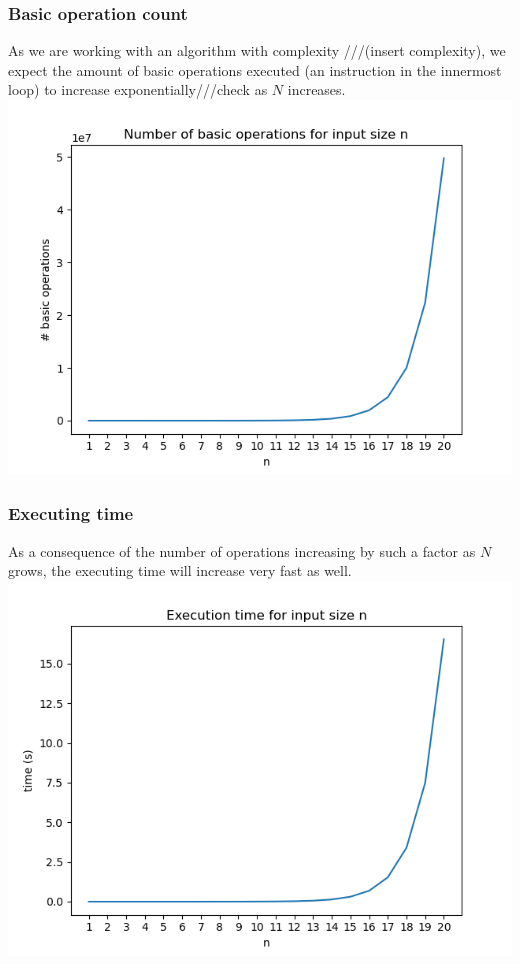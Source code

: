 \documentclass[...]{revdetua}
\begin{document}
\subsubsection{Basic operation count}
As we are working with an algorithm with complexity ///(insert complexity), we expect the amount of basic operations executed (an instruction in the innermost loop) to increase exponentially///check as $N$ increases.
\includegraphics[scale=0.5]{basic_ops.png}
\subsubsection{Executing time}
As a consequence of the number of operations increasing by such a factor as $N$ grows, the executing time will increase very fast as well.
\includegraphics[scale=0.5]{exe_time.png}
\end{document}
